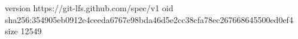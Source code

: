 version https://git-lfs.github.com/spec/v1
oid sha256:354905eb0912e4ceeda6767e98bda46d5e2cc38cfa78ec267668645500ed0ef4
size 12549
